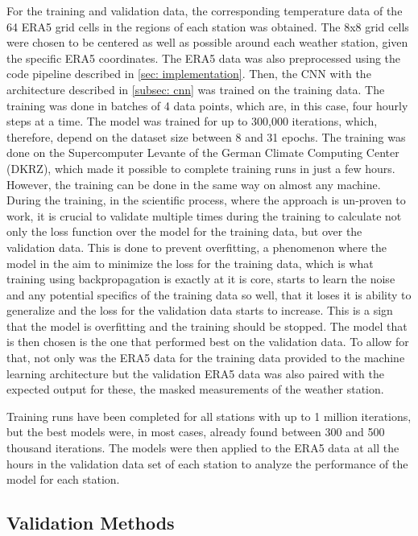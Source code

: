 For the training and validation data, the corresponding temperature data of the 64 ERA5 grid cells in the regions of each station was obtained.
The 8x8 grid cells were chosen to be centered as well as possible around each weather station, given the specific ERA5 coordinates.
The ERA5 data was also preprocessed using the code pipeline described in \autoref{sec: implementation}.
Then, the CNN with the architecture described in \autoref{subsec: cnn} was trained on the training data.
The training was done in batches of 4 data points, which are, in this case, four hourly steps at a time.
The model was trained for up to 300,000 iterations, which, therefore, depend on the dataset size between 8 and 31 epochs. The training was done on the Supercomputer Levante of the German Climate Computing Center (DKRZ), which made it possible to complete training runs in just a few hours.
However, the training can be done in the same way on almost any machine.
During the training, in the scientific process, where the approach is un-proven to work, it is crucial to validate multiple times during the training to calculate not only the loss function over the model for the training data, but over the validation data.
This is done to prevent overfitting, a phenomenon where the model in the aim to minimize the loss for the training data, which is what training using backpropagation is exactly at it is core, starts to learn the noise and any potential specifics of the training data so well, that it loses it is ability to generalize and the loss for the validation data starts to increase.
This is a sign that the model is overfitting and the training should be stopped. The model that is then chosen is the one that performed best on the validation data.
To allow for that, not only was the ERA5 data for the training data provided to the machine learning architecture but the validation ERA5 data was also paired with the expected output for these, the masked measurements of the weather station.

Training runs have been completed for all stations with up to 1 million iterations, but the best models were, in most cases, already found between 300 and 500 thousand iterations.
The models were then applied to the ERA5 data at all the hours in the validation data set of each station to analyze the performance of the model for each station. 

\subsection{Validation Methods}

